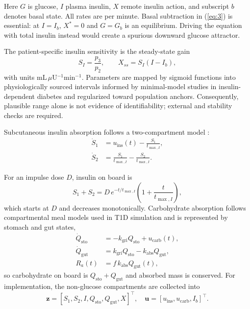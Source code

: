 \documentclass[journal]{IEEEtran}
\begin{document}
Here $G$ is glucose, $I$ plasma insulin, $X$ remote insulin action, and subscript $b$ denotes basal state. All rates are per minute. Basal subtraction in (\ref{eq:3}) is essential: at $I = I_b$, $X^* = 0$ and $G = G_b$ is an equilibrium. Driving the equation with total insulin instead would create a spurious downward glucose attractor.

The patient-specific insulin sensitivity is the steady-state gain
\begin{equation}
S_I = \frac{p_3}{p_2}, \qquad X_{ss} = S_I (I - I_b),
\label{eq:5}
\end{equation}
with units mL\,$\mu$U$^{-1}$min$^{-1}$. Parameters are mapped by sigmoid functions into physiologically sourced intervals informed by minimal-model studies in insulin-dependent diabetes \cite{ref33} and regularized toward population anchors. Consequently, plausible range alone is not evidence of identifiability; external and stability checks are required.

Subcutaneous insulin absorption follows a two-compartment model \cite{ref34}:
\begin{align}
\dot{S}_1 &= u_{\text{ins}}(t) - \frac{S_1}{t_{\max,I}}, \label{eq:6}\\
\dot{S}_2 &= \frac{S_1}{t_{\max,I}} - \frac{S_2}{t_{\max,I}}. \label{eq:7}
\end{align}

For an impulse dose $D$, insulin on board is
\begin{equation}
S_1 + S_2 = D\,e^{-t/t_{\max,I}}\left(1 + \frac{t}{t_{\max,I}}\right),
\label{eq:8}
\end{equation}
which starts at $D$ and decreases monotonically. Carbohydrate absorption follows compartmental meal models used in T1D simulation \cite{ref35,ref36,ref37} and is represented by stomach and gut states,
\begin{align}
\dot{Q}_{\text{sto}} &= -k_{\text{gri}} Q_{\text{sto}} + u_{\text{carb}}(t), \label{eq:9}\\
\dot{Q}_{\text{gut}} &= k_{\text{gri}} Q_{\text{sto}} - k_{\text{abs}} Q_{\text{gut}}, \label{eq:10}\\
R_a(t) &= f\, k_{\text{abs}} Q_{\text{gut}}(t), \label{eq:11}
\end{align}
so carbohydrate on board is $Q_{\text{sto}} + Q_{\text{gut}}$ and absorbed mass is conserved. For implementation, the non-glucose compartments are collected into
\begin{equation}
\mathbf{z} = [S_1, S_2, I, Q_{\text{sto}}, Q_{\text{gut}}, X]^\top, \quad \mathbf{u} = [u_{\text{ins}}, u_{\text{carb}}, I_b]^\top.
\label{eq:12}
\end{equation}
\end{document}
